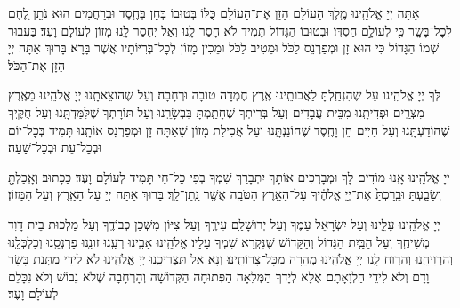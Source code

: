 \documentclass[twoside, openany, parskip=half, 11pt]{book}
\begin{document}
\nextpage
{}
אַתָּה יְיָ אֱלֹהֵֽינוּ מֶֽלֶךְ הָעוֹלָם הַזָּן אֶת־הָעוֹלָם כֻּלּוֹ בְּטוּבוֹ בְּחֵן בְּחֶֽסֶד וּבְרַחֲמִים הוּא נֹתֵ֣ן לֶ֭חֶם לְכׇל־בָּשָׂ֑ר כִּ֖י לְעוֹלָ֣ם חַסְדּֽוֹ׃ וּבְטוּבוֹ הַגָּדוֹל תָּמִיד לֹא חָסַר לָֽנוּ וְאַל יֶחְסַר לָֽנוּ מָזוֹן לְעוֹלָם וָעֶד׃ בַּעֲבוּר שְׁמוֹ הַגָּדוֹל כִּי הוּא זָן וּמְפַרְנֵס לַכֹּל וּמֵטִיב לַכֹּל וּמֵכִין מָזוֹן לְכׇל־בְּרִיּוֹתָיו אֲשֶׁר בָּרָא׃ בָּרוּךְ אַתָּה יְיָ הַזָּן אֶת־הַכֹּל׃



לְּךָ יְיָ אֱלֹהֵֽינוּ עַל שֶׁהִנְחַֽלְתָּ לַאֲבוֹתֵֽינוּ אֶֽרֶץ חֶמְדָה טוֹבָה וּרְחָבָה׃ וְעַל שֶׁהוֹצֵאתָֽנוּ יְיָ אֱלֹהֵֽינוּ מֵאֶֽרֶץ מִצְרַֽיִם וּפְדִיתָֽנוּ מִבֵּית עֲבָדִים וְעַל בְּרִיתְךָ שֶׁחָתַֽמְתָּ בִּבְשָׂרֵֽנוּ וְעַל תּוֹרָתְךָ שֶׁלִּמַּדְתָּֽנוּ וְעַל חֻקֶּֽיךָ שֶׁהוֹדַעְתָּֽנוּ וְעַל חַיִּים חֵן וָחֶֽסֶד שֶׁחוֹנַנְתָּֽנוּ וְעַל אֲכִילַת מָזוֹן שָׁאַתָּה זָן וּמְפַרְנֵס אוֹתָֽנוּ תָּמִיד בְּכׇל־יוֹם וּבְכׇל־עֵת וּבְכׇל־שָׁעָה׃


\alhanisim

יְיָ אֱלֹהֵֽינוּ אָֽנוּ מוֹדִים לָךְ וּמְבָרְכִים אוֹתָךְ יִתְבָּרַךְ שִׁמְךָ בְּפִי כׇל־חַי תָּמִיד לְעוֹלָם וָעֶד׃ כַּכָּתוּב׃ וְאָֽכַלְתָּ֖ וְשָׂבָ֑עְתָּ וּבֵֽרַכְתָּ֙ אֶת־יְיָ֣ אֱלֹהֶ֔יךָ עַל־הָאָ֥רֶץ הַטֹּבָ֖ה אֲשֶׁ֥ר נָֽתַן־לָֽךְ׃ בָּרוּךְ אַתָּה יְיָ עַל הָאָֽרֶץ וְעַל הַמָּזוֹן׃



יְיָ אֱלֹהֵֽינוּ עָלֵֽינוּ וְעַל יִשְׂרָאֵל עַמֶּךָ וְעַל יְרוּשָׁלַ‍ִם עִירֶֽךָ וְעַל צִיּוֹן מִשְׁכַּן כְּבוֹדֶֽךָ וְעַל מַלְכוּת בֵּית דָּוִד מְשִׁיחֶֽךָ וְעַל הַבַּֽיִת הַגָּדוֹל וְהַקָּדוֹשׁ שֶׁנִּקְרָא שִׁמְךָ עָלָיו׃ אֱלֹהֵֽינוּ אָבִֽינוּ רְעֵֽנוּ זוּנֵֽנוּ פַרְנְסֵֽנוּ וְכַלְכְּלֵֽנוּ וְהַרְוִיחֵֽנוּ וְהַרְוַח לָֽנוּ יְיָ אֱלֹהֵֽינוּ מְהֵרָה מִכׇּל־צָרוֹתֵֽינוּ׃ וְנָא אַל תַּצְרִיכֵֽנוּ יְיָ אֱלֹהֵֽינוּ לֹא לִידֵי מַתְּנַת בָּשָׂר וָדָם וְלֹא לִידֵי הַלְוָאָתָם אֶלָּא לְיָדְךָ הַמְּלֵאָה הַפְּתוּחָה הַקְּדוֹשָׁה וְהָרְחָבָה שֶׁלֹּא נֵבוֹשׁ וְלֹא נִכָּלֵם לְעוֹלָם וָעֶד׃

\enlargethispage{\baselineskip}
\end{document}
